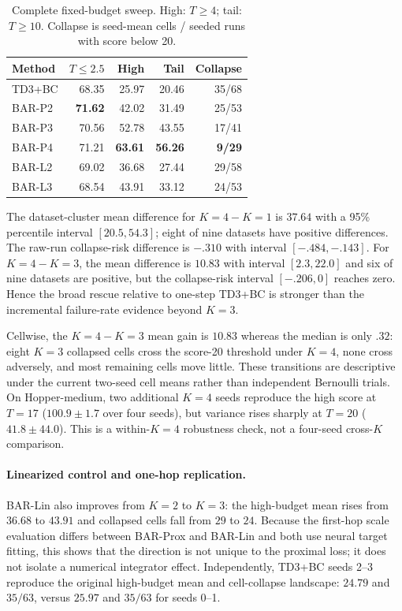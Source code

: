 \begin{table}[t]
\caption{Complete fixed-budget sweep. High: $T\ge4$; tail: $T\ge10$. Collapse is seed-mean cells / seeded runs with score below 20.}
\centering
\small
\setlength{\tabcolsep}{3.4pt}
\begin{tabular}{lrrrr}
\toprule
Method & $T\le2.5$ & High & Tail & Collapse\\
\midrule
TD3+BC &68.35&25.97&20.46&35/68\\
BAR-P2 &\textbf{71.62}&42.02&31.49&25/53\\
BAR-P3 &70.56&52.78&43.55&17/41\\
BAR-P4 &71.21&\textbf{63.61}&\textbf{56.26}&\textbf{9/29}\\
BAR-L2 &69.02&36.68&27.44&29/58\\
BAR-L3 &68.54&43.91&33.12&24/53\\
\bottomrule
\end{tabular}
\label{tab:aggregate}
\end{table}

The dataset-cluster mean difference for $K=4-K=1$ is $37.64$ with a 95\% percentile interval $[20.5,54.3]$; eight of nine datasets have positive differences. The raw-run collapse-risk difference is $-.310$ with interval $[-.484,-.143]$. For $K=4-K=3$, the mean difference is $10.83$ with interval $[2.3,22.0]$ and six of nine datasets are positive, but the collapse-risk interval $[-.206,0]$ reaches zero. Hence the broad rescue relative to one-step TD3+BC is stronger than the incremental failure-rate evidence beyond $K=3$.

Cellwise, the $K=4-K=3$ mean gain is $10.83$ whereas the median is only $.32$: eight $K=3$ collapsed cells cross the score-20 threshold under $K=4$, none cross adversely, and most remaining cells move little. These transitions are descriptive under the current two-seed cell means rather than independent Bernoulli trials. On Hopper-medium, two additional $K=4$ seeds reproduce the high score at $T=17$ ($100.9\pm1.7$ over four seeds), but variance rises sharply at $T=20$ ($41.8\pm44.0$). This is a within-$K=4$ robustness check, not a four-seed cross-$K$ comparison.

\paragraph{Linearized control and one-hop replication.}
BAR-Lin also improves from $K=2$ to $K=3$: the high-budget mean rises from $36.68$ to $43.91$ and collapsed cells fall from $29$ to $24$. Because the first-hop scale evaluation differs between BAR-Prox and BAR-Lin and both use neural target fitting, this shows that the direction is not unique to the proximal loss; it does not isolate a numerical integrator effect. Independently, TD3+BC seeds 2--3 reproduce the original high-budget mean and cell-collapse landscape: $24.79$ and $35/63$, versus $25.97$ and $35/63$ for seeds 0--1.

